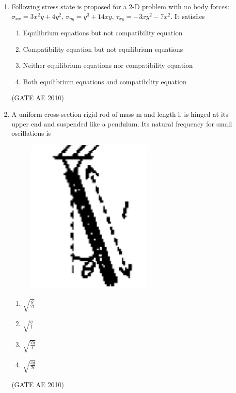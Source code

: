 \documentclass[journal]{IEEEtran}
\begin{document}
\begin{enumerate}
\item Following stress state is proposed for a 2-D problem with no body forces: $\sigma_{xx} = 3x^2y + 4y^2$, $\sigma_{yy} = y^3 + 14xy$, $\tau_{xy} = -3xy^2 - 7x^2$. It satisfies
\begin{enumerate}
\item Equilibrium equations but not compatibility equation
\item Compatibility equation but not equilibrium equations
\item Neither equilibrium equations nor compatibility equation
\item Both equilibrium equations and compatibility equation
\end{enumerate}
\hfill (GATE AE 2010)

\item A uniform cross-section rigid rod of mass m and length l. is hinged at its upper end and suspended like a pendulum. Its natural frequency for small oscillations is
    
\begin{figure}[H]
    \centering
    \includegraphics[width=0.6\textwidth]{4.png}
    \caption{}
    \label{fig:question28}
\end{figure}
    
\begin{multicols}{4}
\begin{enumerate}
\item $\sqrt{\frac{g}{2l}}$
\item $\sqrt{\frac{g}{l}}$
\item $\sqrt{\frac{2g}{l}}$
\item $\sqrt{\frac{3g}{2l}}$
\end{enumerate}
\end{multicols}
\hfill (GATE AE 2010)


\end{enumerate}
\end{document}
